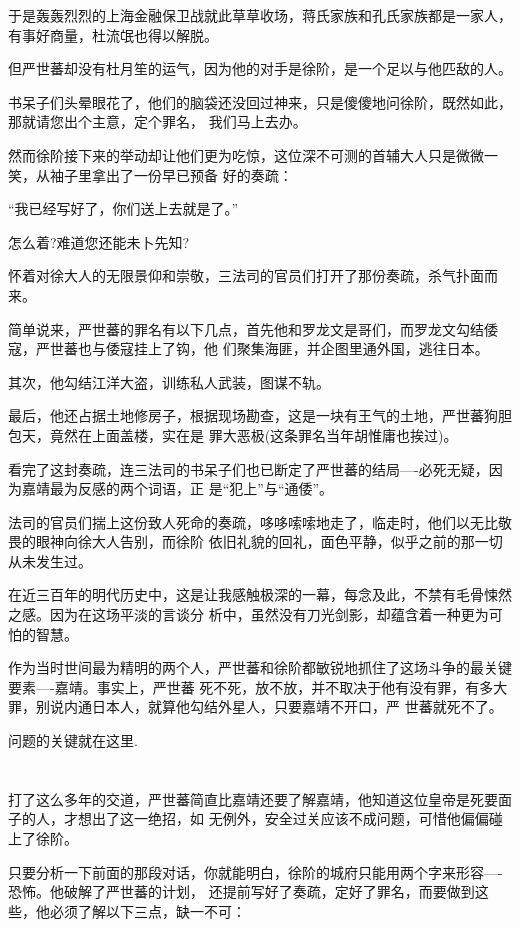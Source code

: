 \documentclass[11pt,a4paper,onecolumn]{article}
\begin{document}
于是轰轰烈烈的上海金融保卫战就此草草收场，蒋氏家族和孔氏家族都是一家人，有事好商量，杜流氓也得以解脱。

但严世蕃却没有杜月笙的运气，因为他的对手是徐阶，是一个足以与他匹敌的人。

书呆子们头晕眼花了，他们的脑袋还没回过神来，只是傻傻地问徐阶，既然如此，那就请您出个主意，定个罪名，
我们马上去办。

然而徐阶接下来的举动却让他们更为吃惊，这位深不可测的首辅大人只是微微一笑，从袖子里拿出了一份早已预备
好的奏疏：

``我已经写好了，你们送上去就是了。''

怎么着?难道您还能未卜先知?

怀着对徐大人的无限景仰和崇敬，三法司的官员们打开了那份奏疏，杀气扑面而来。

简单说来，严世蕃的罪名有以下几点，首先他和罗龙文是哥们，而罗龙文勾结倭寇，严世蕃也与倭寇挂上了钩，他
们聚集海匪，并企图里通外国，逃往日本。

其次，他勾结江洋大盗，训练私人武装，图谋不轨。

最后，他还占据土地修房子，根据现场勘查，这是一块有王气的土地，严世蕃狗胆包天，竟然在上面盖楼，实在是
罪大恶极(这条罪名当年胡惟庸也挨过)。

看完了这封奏疏，连三法司的书呆子们也已断定了严世蕃的结局----必死无疑，因为嘉靖最为反感的两个词语，正
是``犯上''与``通倭''。

法司的官员们揣上这份致人死命的奏疏，哆哆嗦嗦地走了，临走时，他们以无比敬畏的眼神向徐大人告别，而徐阶
依旧礼貌的回礼，面色平静，似乎之前的那一切从未发生过。

在近三百年的明代历史中，这是让我感触极深的一幕，每念及此，不禁有毛骨悚然之感。因为在这场平淡的言谈分
析中，虽然没有刀光剑影，却蕴含着一种更为可怕的智慧。

作为当时世间最为精明的两个人，严世蕃和徐阶都敏锐地抓住了这场斗争的最关键要素----嘉靖。事实上，严世蕃
死不死，放不放，并不取决于他有没有罪，有多大罪，别说内通日本人，就算他勾结外星人，只要嘉靖不开口，严
世蕃就死不了。

问题的关键就在这里.

\section[\thesection]{}

打了这么多年的交道，严世蕃简直比嘉靖还要了解嘉靖，他知道这位皇帝是死要面子的人，才想出了这一绝招，如
无例外，安全过关应该不成问题，可惜他偏偏碰上了徐阶。

只要分析一下前面的那段对话，你就能明白，徐阶的城府只能用两个字来形容----恐怖。他破解了严世蕃的计划，
还提前写好了奏疏，定好了罪名，而要做到这些，他必须了解以下三点，缺一不可：
\end{document}

